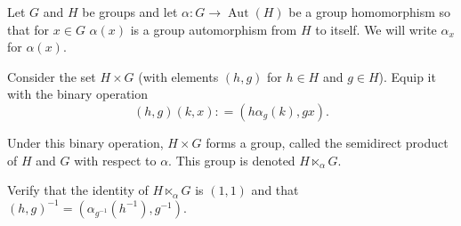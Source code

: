 \documentclass[12 pt, letterpaper]{hmcpset}
\begin{document}
\begin{problem}[1.]
	Let $G$ and $H$ be groups and let $\alpha : G \to \operatorname{Aut}(H)$ be a group homomorphism so that for $x \in G$ $\alpha(x)$ is a group automorphism from $H$ to itself. We will write $\alpha_{x}$ for $\alpha(x)$. 

	Consider the set $H \times G$ (with elements $(h, g)$ for $h \in H$ and $g \in H$). Equip it with the binary operation
	\[
		(h, g)(k, x) : = (h \alpha_{g}(k), gx).
	\]

	Under this binary operation, $H \times G$ forms a group, called the semidirect product of $H$ and $G$ with respect to $\alpha$. This group is denoted $H \ltimes_{\alpha} G$. 

	Verify that the identity of $H \ltimes_{\alpha} G$ is $(1, 1)$ and that $(h, g)^{-1} = (\alpha_{g^{-1}}(h^{-1}), g^{-1})$.
\end{problem}
\end{document}
